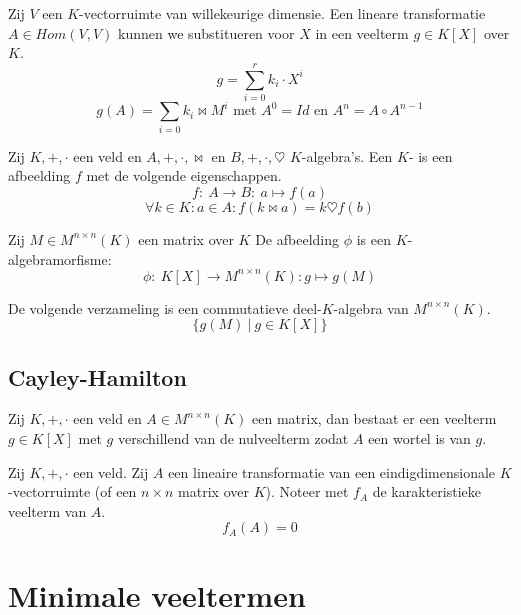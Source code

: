 \documentclass[main.tex]{subfiles}
\begin{document}
\begin{de}
  Zij $V$ een $K$-vectorruimte van willekeurige dimensie.
  Een lineare transformatie $A \in Hom(V,V)$ kunnen we substitueren voor $X$ in een veelterm $g\in K[X]$ over $K$.
  \[ g = \sum_{i=0}^{r}k_{i}\cdot X^{i} \]
  \[ g(A) = \sum_{i=0}k_{i}\bowtie M^{i} \text{ met } A^{0} = Id \text{ en } A^{n} = A\circ A^{n-1}\]
\end{de}

\begin{de}
  Zij $K,+,\cdot$ een veld en $A,+,\cdot,\bowtie$ en $B,+,\cdot,\heartsuit$ $K$-algebra's.
  Een $K$- is een afbeelding $f$ met de volgende eigenschappen.
  \[ f:\ A \rightarrow B:\ a \mapsto f(a) \]
  \[ \forall k\in K: a\in A: f(k\bowtie a) = k \heartsuit f(b) \]
\end{de}

\begin{st}
  Zij $M\in M^{n\times n}(K)$ een matrix over $K$ De afbeelding $\phi$ is een $K$-algebramorfisme:
  \[ \phi:\ K[X] \rightarrow M^{n\times n}(K): g \mapsto g(M) \]
\end{st}

\begin{st}
  De volgende verzameling is een commutatieve deel-$K$-algebra van $M^{n\times n}(K)$.
  \[ \{ g(M) \ |\ g \in K[X] \} \]
\end{st}

\subsection{Cayley-Hamilton}
\label{sec:cayley-hamilton-1}

\begin{ei}
  Zij $K,+,\cdot$ een veld en $A\in M^{n\times n}(K)$ een matrix, dan bestaat er een veelterm $g\in K[X]$ met $g$ verschillend van de nulveelterm zodat $A$ een wortel is van $g$.
\end{ei}

\begin{st}
  Zij $K,+,\cdot$ een veld.
  Zij $A$ een lineaire transformatie van een eindigdimensionale $K$-vectorruimte (of een $n\times n$ matrix over $K$). Noteer met $f_{A}$ de karakteristieke veelterm van $A$.
  \[ f_{A}(A) = 0 \]
\end{st}

\section{Minimale veeltermen}
\label{sec:minimale-veeltermen}
\end{document}
